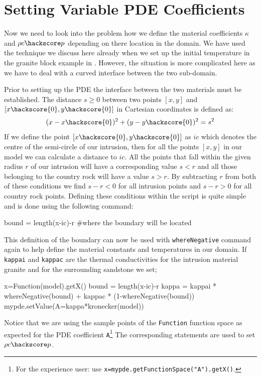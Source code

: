 \section{Setting Variable PDE Coefficients}
Now we need to look into the problem how we define the material coefficients
$\kappa$ and $\rho c\hackscore p$ depending on there location in the domain. 
We have used the technique we discuss here already when we set up the initial
temperature in the granite block example in . However,
the situation is more complicated here as we have to deal with a
curved interface between the two sub-domain.

Prior to setting up the PDE the interface between the two materials must be established. 
The distance $s\ge 0$ between two points $[x,y]$ and $[x\hackscore{0},y\hackscore{0}]$ in Cartesian coordinates is defined as:
\begin{equation}
 (x-x\hackscore{0})^{2}+(y-y\hackscore{0})^{2} = s^{2}
\end{equation}
If we define the point $[x\hackscore{0},y\hackscore{0}]$ as $ic$ which denotes the centre of the semi-circle of our intrusion, then for all the points $[x,y]$ in our model we can calculate a distance to $ic$. 
All the points that fall within the given radius $r$ of our intrusion will have a corresponding 
value $s < r$ and all those belonging to the country rock will have a value $s > r$. By subtracting $r$ from both of these conditions we find $s-r < 0$ for all intrusion points and $s-r > 0$ 
for all country rock points. 
Defining these conditions within the script is quite simple and is done using the following command:
\begin{python}
 bound = length(x-ic)-r #where the boundary will be located
\end{python}
This definition of the boundary can now be used with \verb|whereNegative| command again to help define the material constants and temperatures in our domain. 
If \verb|kappai| and \verb|kappac| are the 
thermal conductivities for the intrusion material granite and for the surrounding sandstone we set; 
\begin{python}
x=Function(model).getX()
bound = length(x-ic)-r
kappa = kappai * whereNegative(bound) + kappac * (1-whereNegative(bound))
mypde.setValue(A=kappa*kronecker(model))
\end{python}
Notice that we are using the sample points of the \verb|Function| function space as expected for the 
PDE coefficient \verb|A|\footnote{For the experience user: use \texttt{x=mypde.getFunctionSpace("A").getX()}.}
The corresponding statements are used to set $\rho c\hackscore p$. 

